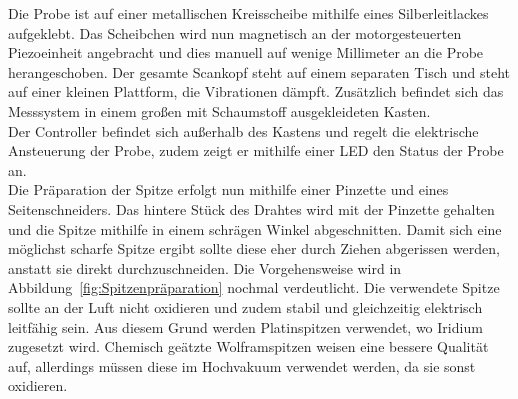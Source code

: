 \documentclass[a4paper,twoside,final]{article}
\begin{document}
Die Probe ist auf einer metallischen Kreisscheibe mithilfe eines Silberleitlackes aufgeklebt. Das Scheibchen wird nun magnetisch an der motorgesteuerten Piezoeinheit angebracht und dies manuell auf wenige Millimeter an die Probe herangeschoben.
Der gesamte Scankopf steht auf einem separaten Tisch und steht auf einer kleinen Plattform, die Vibrationen dämpft. Zusätzlich befindet sich das Messsystem in einem großen mit Schaumstoff ausgekleideten Kasten.\\
Der Controller befindet sich außerhalb des Kastens und regelt die elektrische Ansteuerung der Probe, zudem zeigt er mithilfe einer LED den Status der Probe an.\\
Die Präparation der Spitze erfolgt nun mithilfe einer Pinzette und eines Seitenschneiders. Das hintere Stück des Drahtes wird mit der Pinzette gehalten und die Spitze mithilfe in einem schrägen Winkel abgeschnitten. Damit sich eine möglichst scharfe Spitze ergibt sollte diese eher durch Ziehen abgerissen werden, anstatt sie direkt durchzuschneiden. Die Vorgehensweise wird in Abbildung~\ref{fig:Spitzenpräparation} nochmal verdeutlicht. Die verwendete Spitze sollte an der Luft nicht oxidieren und zudem stabil und gleichzeitig elektrisch leitfähig sein. Aus diesem Grund werden Platinspitzen verwendet, wo Iridium zugesetzt wird. Chemisch geätzte Wolframspitzen weisen eine bessere Qualität auf, allerdings müssen diese im Hochvakuum verwendet werden, da sie sonst oxidieren.
\end{document}
